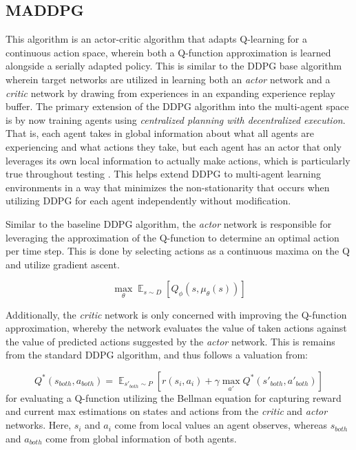 \documentclass[11pt]{article}
\begin{document}
	\subsection{MADDPG}
	
	This algorithm is an actor-critic algorithm that adapts Q-learning for a continuous action space, wherein both a Q-function approximation is learned alongside a serially adapted policy. This is similar to the DDPG base algorithm wherein target networks are utilized in learning both an \textit{actor} network and a \textit{critic} network by drawing from experiences in an expanding experience replay buffer. The primary extension of the DDPG algorithm into the multi-agent space is by now training agents using \textit{centralized planning with decentralized execution}. That is, each agent takes in global information about what all agents are experiencing and what actions they take, but each agent has an actor that only leverages its own local information to actually make actions, which is particularly true throughout testing \cite{maddpg}. This helps extend DDPG to multi-agent learning environments in a way that minimizes the non-stationarity that occurs when utilizing DDPG for each agent independently without modification.
	
	Similar to the baseline DDPG algorithm, the \textit{actor} network is responsible for leveraging the approximation of the Q-function to determine an optimal action per time step. This is done by selecting actions as a continuous maxima on the Q and utilize gradient ascent.
	
	\begin{equation}
		\mathop{\mathbb{\text{max}}}_\theta\mathop{\mathbb{E}}_{s\sim D}\left[Q_{\phi}\left(s, \mu_{\theta}(s)\right)\right]
	\end{equation}
	
	Additionally, the \textit{critic} network is only concerned with improving the Q-function approximation, whereby the network evaluates the value of taken actions against the value of predicted actions suggested by the \textit{actor} network. This is remains from the standard DDPG algorithm, and thus follows a valuation from:
	
	\begin{equation}
		Q^*(s_{both}, a_{both}) = \mathop{\mathbb{E}}_{s'_{both} \sim P}\left[r(s_i, a_i) + \gamma\mathop{\mathbb{\text{max}}}_{a'}Q^*(s'_{both}, a'_{both})\right]
	\end{equation}
	for evaluating a Q-function utilizing the Bellman equation for capturing reward and current max estimations on states and actions from the \textit{critic} and \textit{actor} networks. Here, $s_i$ and $a_i$ come from local values an agent observes, whereas $s_{both}$ and $a_{both}$ come from global information of both agents.
	
\end{document}
